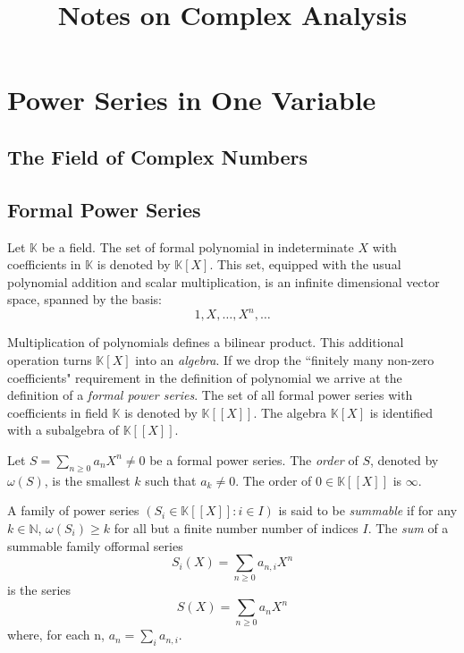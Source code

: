 \documentclass[12pt]{article}
\title{Notes on Complex Analysis}
\author{}
\newcommand{\KK}{\mathbb{K}}
\newcommand{\NN}{\mathbb{N}}
\theoremstyle{definition}
\begin{document}
\maketitle
\tableofcontents
\newpage
\section{Power Series in One Variable}
\subsection{The Field of Complex Numbers}

\subsection{Formal Power Series}
Let $\KK$ be a field. The set of formal polynomial in indeterminate $X$ with coefficients in $\KK$ is denoted by $\KK[X]$. This set, equipped with the usual polynomial addition and scalar multiplication, is an infinite dimensional vector space, spanned by the basis: \[ 1, X, \ldots, X^n, \ldots \]

	Multiplication of polynomials defines a bilinear product. This additional operation turns $\KK[X]$ into an \emph{algebra}. If we drop the ``finitely many non-zero coefficients" requirement in the definition of polynomial we arrive at the definition of a \emph{formal power series}. The set of all formal power series with coefficients in field $\KK$ is denoted by $\KK[[X]]$. The algebra $\KK[X]$ is identified with a subalgebra of $\KK[[X]]$.
\par
Let $S = \sum_{n \geq 0} a_nX^n \neq 0$ be a formal power series. The \emph{order} of $S$, denoted by $\omega(S)$, is the smallest $k$ such that $a_k \neq 0$. The order of $0 \in \KK[[X]]$ is $\infty$.
\par
A family of power series $(S_i \in \KK[[X]]: i \in I)$  is said to be \emph{summable} if for any $k \in \NN$, $\omega(S_i) \geq k$ for all but a finite number number of indices $I$. The \emph{sum} of a summable family offormal series
\[
	S_i(X) = \sum_{n \geq 0} a_{n,i} X^n
\]
is the series
\[ 
S(X) = \sum_{n \geq 0} a_n X^n
\]
where, for each n, $a_n = \sum_i a_{n,i}$.
\end{document}
